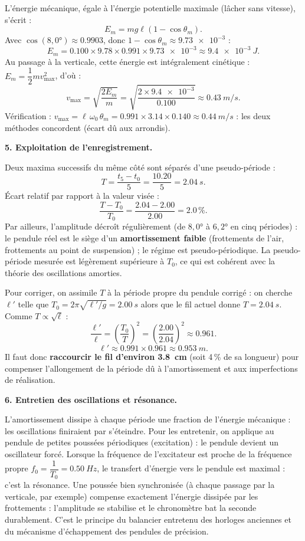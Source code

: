 \documentclass[11pt]{article}
\newcommand{\cle}[1]{{\popxbold\color{popdark}#1}}
\begin{document}
\begin{exoresolu}
L'énergie mécanique, égale à l'énergie potentielle maximale (lâcher sans vitesse), s'écrit :
\[ E_m = mg\ell(1-\cos\theta_m). \]
Avec $\cos(8,0°) \approx \num{0,9903}$, donc $1-\cos\theta_m \approx \num{9,73e-3}$ :
\[ E_m = \num{0,100}\times \num{9,78}\times \num{0,991}\times \num{9,73e-3} \approx \SI{9,4e-3}{J}. \]
Au passage à la verticale, cette énergie est intégralement cinétique : $E_m = \dfrac{1}{2}mv_{\max}^2$, d'où :
\[ v_{\max} = \sqrt{\frac{2E_m}{m}} = \sqrt{\frac{2\times \num{9,4e-3}}{\num{0,100}}} \approx \SI{0,43}{m/s}. \]
Vérification : $v_{\max} = \ell\,\omega_0\,\theta_m = \num{0,991}\times \num{3,14}\times \num{0,140} \approx \SI{0,44}{m/s}$ : les deux méthodes concordent (écart dû aux arrondis).

\textbf{5. Exploitation de l'enregistrement.}

Deux maxima successifs du même côté sont séparés d'une pseudo-période :
\[ T = \frac{t_5 - t_0}{5} = \frac{\num{10,20}}{5} = \SI{2,04}{s}. \]
Écart relatif par rapport à la valeur visée :
\[ \frac{T - T_0}{T_0} = \frac{\num{2,04}-\num{2,00}}{\num{2,00}} = \num{2,0}\,\%. \]
Par ailleurs, l'amplitude décroît régulièrement (de $8,0°$ à $6,2°$ en cinq périodes) : le pendule réel est le siège d'un \textbf{amortissement faible} (frottements de l'air, frottements au point de suspension) ; le régime est \cle{pseudo-périodique}. La pseudo-période mesurée est légèrement supérieure à $T_0$, ce qui est cohérent avec la théorie des oscillations amorties.

Pour corriger, on assimile $T$ à la période propre du pendule corrigé : on cherche $\ell'$ telle que $T_0 = 2\pi\sqrt{\ell'/g} = \SI{2,00}{s}$ alors que le fil actuel donne $T = \SI{2,04}{s}$. Comme $T \propto \sqrt{\ell}$ :
\[ \frac{\ell'}{\ell} = \left(\frac{T_0}{T}\right)^2 = \left(\frac{\num{2,00}}{\num{2,04}}\right)^2 \approx \num{0,961}. \]
\[ \ell' \approx \num{0,991}\times \num{0,961} \approx \SI{0,953}{m}. \]
Il faut donc \textbf{raccourcir le fil d'environ \SI{3,8}{cm}} (soit \num{4}\,\% de sa longueur) pour compenser l'allongement de la période dû à l'amortissement et aux imperfections de réalisation.

\textbf{6. Entretien des oscillations et résonance.}

L'amortissement dissipe à chaque période une fraction de l'énergie mécanique : les oscillations finiraient par s'éteindre. Pour les entretenir, on applique au pendule de petites poussées périodiques (excitation) : le pendule devient un \cle{oscillateur forcé}. Lorsque la fréquence de l'excitateur est proche de la fréquence propre $f_0 = \dfrac{1}{T_0} = \SI{0,50}{Hz}$, le transfert d'énergie vers le pendule est maximal : c'est la \cle{résonance}. Une poussée bien synchronisée (à chaque passage par la verticale, par exemple) compense exactement l'énergie dissipée par les frottements : l'amplitude se stabilise et le chronomètre bat la seconde durablement. C'est le principe du balancier entretenu des horloges anciennes et du mécanisme d'échappement des pendules de précision.
\end{exoresolu}
\end{document}
